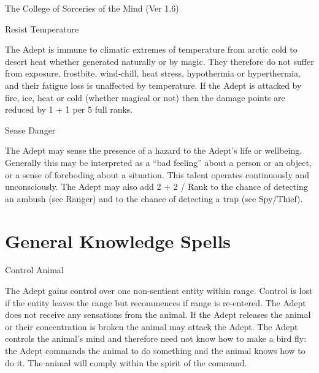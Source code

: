 \begin{Chapter}{The College of Sorceries of the Mind (Ver 1.6)}
\begin{talent}[T-2]{Resist Temperature}

\begin{effects}
The Adept is immune to climatic extremes of temperature from arctic
cold to desert heat whether generated naturally or by magic.  They
therefore do not suffer from exposure, frostbite, wind-chill, heat
stress, hypothermia or hyperthermia, and their fatigue loss is
unaffected by temperature.  If the Adept is attacked by fire, ice,
heat or cold (whether magical or not) then the damage points are
reduced by 1 + 1 per 5 full ranks.
\end{effects}
\end{talent}

\begin{talent}[T-3]{Sense Danger}

\begin{effects}
The Adept may sense the presence of a hazard to the Adept’s life or
wellbeing.  Generally this may be interpreted as a “bad feeling” about
a person or an object, or a sense of foreboding about a situation.
This talent operates continuously and unconsciously.  The Adept may
also add 2 + 2 / Rank to the chance of detecting an ambush (see
Ranger) and to the chance of detecting a trap (see Spy/Thief).
\end{effects}
\end{talent}

\section{General Knowledge Spells}

\begin{spell}[G-1]{Control Animal}

\begin{effects}
The Adept gains control over one non-sentient entity within range.
Control is lost if the entity leaves the range but recommences if
range is re-entered.  The Adept does not receive any sensations from
the animal.  If the Adept releases the animal or their concentration
is broken the animal may attack the Adept.  The Adept controls the
animal’s mind and therefore need not know how to make a bird fly: the
Adept commands the animal to do something and the animal knows how to
do it.  The animal will comply within the spirit of the command.
\end{effects}
\end{spell}


\end{Chapter}
